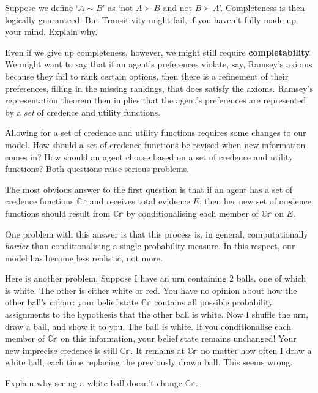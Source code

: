 \begin{exercise}{2}
  Suppose we define `$A\sim B$' as `not $A \succ B$ and not $B \succ A$'.
  Completeness is then logically guaranteed. But Transitivity might fail, if you
  haven't fully made up your mind. Explain why.
\end{exercise}

Even if we give up completeness, however, we might still require
\textbf{completability}. We might want to say that if an agent's preferences
violate, say, Ramsey's axioms because they fail to rank certain options, then
there is a refinement of their preferences, filling in the missing rankings,
that does satisfy the axioms. Ramsey's representation theorem then implies that
the agent's preferences are represented by a \emph{set} of credence and utility
functions.

Allowing for a set of credence and utility functions requires some changes to our
model. How should a set of credence functions be revised when new information
comes in? How should an agent choose based on a set of credence and utility
functions? Both questions raise serious problems.

The most obvious answer to the first question is that if an agent has a set of
credence functions $\mathbb{C\!r}$ and receives total evidence $E$, then her new
set of credence functions should result from $\mathbb{C\!r}$ by conditionalising
each member of $\mathbb{C\!r}$ on $E$.

One problem with this answer is that this process is, in general,
computationally \emph{harder} than conditionalising a single probability
measure. In this respect, our model has become less realistic, not more.

Here is another problem. Suppose I have an urn containing 2 balls, one of which
is white. The other is either white or red. You have no opinion about how the
other ball's colour: your belief state $\mathbb{C\!r}$ contains all possible
probability assignments to the hypothesis that the other ball is white. Now I
shuffle the urn, draw a ball, and show it to you. The ball is white. If you
conditionalise each member of $\mathbb{C\!r}$ on this information, your belief
state remains unchanged! Your new imprecise credence is still $\mathbb{C\!r}$. It
remains at $\mathbb{C\!r}$ no matter how often I draw a white ball, each time
replacing the previously drawn ball. This seems wrong.

\begin{exercise}{3}
  Explain why seeing a white ball doesn't change $\mathbb{C\!r}$.
\end{exercise}


